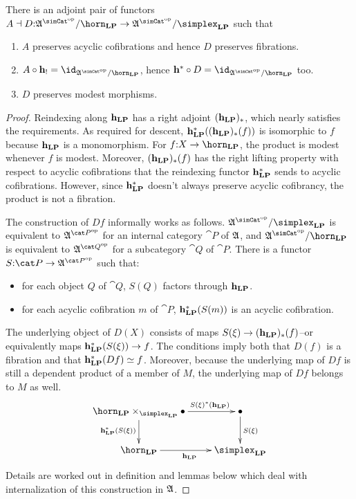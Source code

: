 \documentclass[csh.tex]{subfiles}
\begin{document}
\begin{lemma}
There is an adjoint pair of functors $A\dashv D\of \ambient\s/\horn_\LP \to \ambient\s/\simplex_\LP$ such that
\begin{enumerate}
\item $A$ preserves acyclic cofibrations and hence $D$ preserves fibrations.
\item $A\circ\foh_! = \id_{\ambient\s/\horn_\LP}$, hence $\foh^* \circ D = \id_{\ambient\s/\horn_\LP}$ too.
\item $D$ preserves modest morphisms.
\end{enumerate}
\label{descent}
\end{lemma}

\newcommand\dsum[1]{\Sigma_{#1}}
\begin{proof}




Reindexing along $\mathbf{h}_{\mathbf{LP}}$ has a right adjoint $(\mathbf{h}_{\mathbf{LP}})_*$, which nearly satisfies the requirements. As required for descent, $\mathbf{h}_{\mathbf{LP}}^*((\mathbf{h}_{\mathbf{LP}})_*(f))$ is isomorphic to $f$ because $\mathbf{h}_{\mathbf{LP}}$ is a monomorphism. For $f\of X\to \horn_\LP$, the product is modest whenever $f$ is modest. Moreover, $(\mathbf{h}_{\mathbf{LP}})_*(f)$ has the right lifting property with respect to acyclic cofibrations that the reindexing functor $\mathbf{h}_{\mathbf{LP}}^*$ sends to acyclic cofibrations. However, since $\mathbf{h}_{\mathbf{LP}}^*$ doesn't always preserve acyclic cofibrancy, the product is not a fibration.

The construction of $Df$ informally works as follows.
$\ambient\s/\simplex_\LP$ is equivalent to $\ambient^{\cat P\dual}$ for an internal category $\cat P$ of $\mathfrak A$, and $\ambient\s/\horn_\LP$ is equivalent to $\ambient^{\cat Q\dual}$ for a subcategory $\cat Q$ of $\cat P$. There is a functor $S\of\cat P\to \ambient^{\cat P\dual}$ such that: %
\begin{itemize}
\item for each object $Q$ of $\cat Q$, $S(Q)$ factors through $\mathbf{h}_{\mathbf{LP}}$.
\item for each acyclic cofibration $m$ of $\cat P$, $\mathbf{h}_{\mathbf{LP}}^*(S(m))$ is an acyclic cofibration.
\end{itemize}
The underlying object of $D(X)$ consists of maps $S(\xi)\to(\mathbf{h}_{\mathbf{LP}})_*(f)$--or equivalently maps $\mathbf{h}_{\mathbf{LP}}^*(S(\xi))\to f$. %
The conditions imply both that $D(f)$ is a fibration and that $\mathbf{h}_{\mathbf{LP}}^*(Df) \simeq f$. %
Moreover, because the underlying map of $Df$ is still a dependent product of a member of $M$, the underlying map of $Df$ belongs to $M$ as well. %
\[\xymatrix{
\horn_\LP\times_{\simplex_\LP}\bullet\ar[r]^(.7){S(\xi)\ri(\foh_\LP)}\ar[d]_{\foh_\LP\ri(S(\xi))} & \bullet\ar[d]^{S(\xi)}\\
\horn_\LP \ar[r]_{\foh_\LP} & \simplex_\LP
}\]
Details are worked out in definition and lemmas below which deal with internalization of this construction in $\mathfrak A$.
\end{proof}
\end{document}
